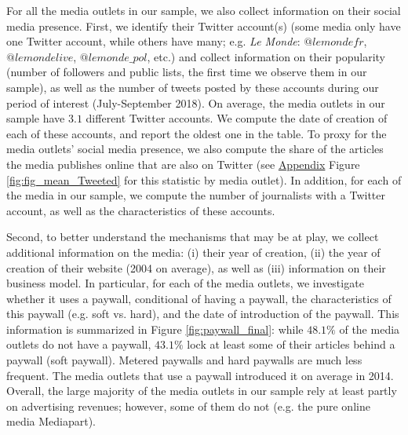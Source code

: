 For all the media outlets in our sample, we also collect information on their social media presence. First, we identify their Twitter account(s) (some media only have one Twitter account, while others have many; e.g. \textit{Le Monde}: $@lemondefr$, $@lemondelive$, $@lemonde\_pol$, etc.) and collect information on their popularity (number of followers and public lists, the first time we observe them in our sample), as well as  the number of tweets posted by these accounts during our period of interest (July-September 2018). On average, the media outlets in our sample have $3.1$ different Twitter accounts. We compute the date of creation of each of these accounts, and report the oldest one in the table. To proxy for the media outlets' social media presence,  we also compute the share of the articles the media publishes online that are also on Twitter (see \hyperlink{ref:Appendix}{Appendix} Figure \ref{fig:fig_mean_Tweeted} for this statistic by media outlet). In addition, for each of the media in our sample, we compute the number of journalists with a Twitter account, as well as the characteristics of these accounts.

Second, to better understand the mechanisms that may be at play, we collect additional information on the media: (i) their year of creation, (ii) the year of creation of their website (2004 on average), as well as (iii) information on their business model. In particular, for each of the media outlets, we investigate whether it uses a paywall, conditional of having a paywall, the characteristics of this paywall (e.g. soft vs. hard), and the date of introduction of the paywall. This information is summarized in Figure \ref{fig:paywall_final}: while $48.1\%$ of the media outlets do not have a paywall, $43.1\%$ lock at least some of their articles behind a paywall (soft paywall). Metered paywalls and hard paywalls are much less frequent. The media outlets that use a paywall introduced it on average in 2014. Overall, the large majority of the media outlets in our sample rely at least partly on advertising revenues; however, some of them do not (e.g. the pure online media Mediapart).


